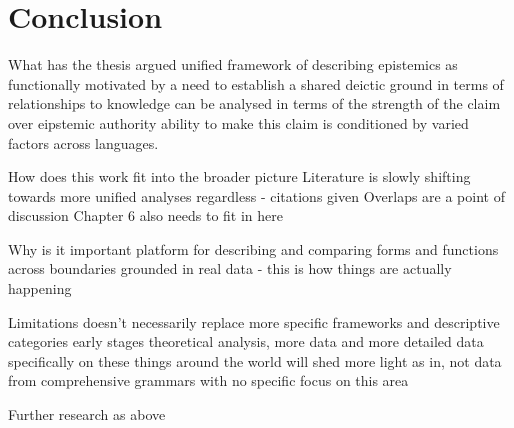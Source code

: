 \chapter{Conclusion}\label{c:Conclusion}
What has the thesis argued
unified framework of describing epistemics as functionally motivated by a need to establish a shared deictic ground in terms of relationships to knowledge
can be analysed in terms of the strength of the claim over eipstemic authority
    ability to make this claim is conditioned by varied factors across languages.

How does this work fit into the broader picture
Literature is slowly shifting towards more unified analyses regardless - citations given
Overlaps are a point of discussion
Chapter 6 also needs to fit in here

Why is it important 
platform for describing and comparing forms and functions across boundaries
grounded in real data - this is how things are actually happening


Limitations
doesn't necessarily replace more specific frameworks and descriptive categories
early stages theoretical analysis, more data and more detailed data specifically on these things around the world will shed more light
    as in, not data from comprehensive grammars with no specific focus on this area

Further research
as above
